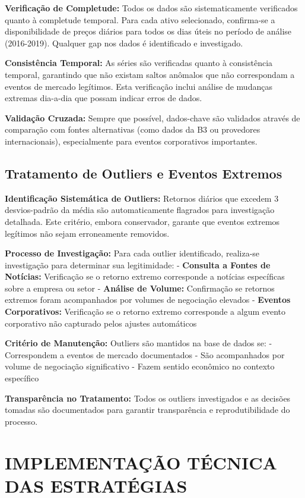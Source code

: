 \textbf{Verificação de Completude:} Todos os dados são sistematicamente verificados quanto à completude temporal. Para cada ativo selecionado, confirma-se a disponibilidade de preços diários para todos os dias úteis no período de análise (2016-2019). Qualquer gap nos dados é identificado e investigado.

\textbf{Consistência Temporal:} As séries são verificadas quanto à consistência temporal, garantindo que não existam saltos anômalos que não correspondam a eventos de mercado legítimos. Esta verificação inclui análise de mudanças extremas dia-a-dia que possam indicar erros de dados.

\textbf{Validação Cruzada:} Sempre que possível, dados-chave são validados através de comparação com fontes alternativas (como dados da B3 ou provedores internacionais), especialmente para eventos corporativos importantes.

\subsection{Tratamento de Outliers e Eventos Extremos}

\textbf{Identificação Sistemática de Outliers:} Retornos diários que excedem 3 desvios-padrão da média são automaticamente flagrados para investigação detalhada. Este critério, embora conservador, garante que eventos extremos legítimos não sejam erroneamente removidos.

\textbf{Processo de Investigação:} Para cada outlier identificado, realiza-se investigação para determinar sua legitimidade:
- \textbf{Consulta a Fontes de Notícias:} Verificação se o retorno extremo corresponde a notícias específicas sobre a empresa ou setor
- \textbf{Análise de Volume:} Confirmação se retornos extremos foram acompanhados por volumes de negociação elevados
- \textbf{Eventos Corporativos:} Verificação se o retorno extremo corresponde a algum evento corporativo não capturado pelos ajustes automáticos

\textbf{Critério de Manutenção:} Outliers são mantidos na base de dados se:
- Correspondem a eventos de mercado documentados
- São acompanhados por volume de negociação significativo
- Fazem sentido econômico no contexto específico

\textbf{Transparência no Tratamento:} Todos os outliers investigados e as decisões tomadas são documentados para garantir transparência e reprodutibilidade do processo.

\section{IMPLEMENTAÇÃO TÉCNICA DAS ESTRATÉGIAS}

